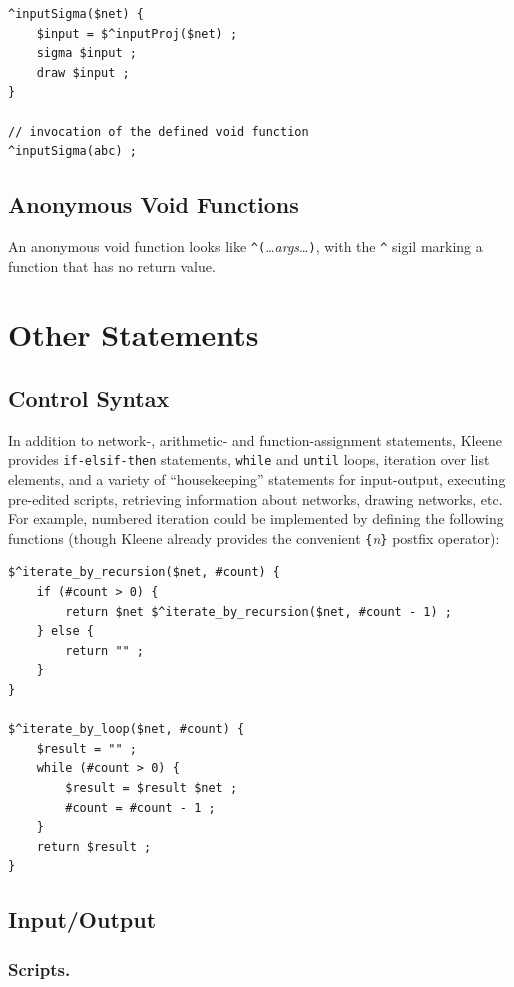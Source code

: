 \documentclass[letterpaper,12pt]{article}
\newcommand{\Kleene}{Kleene\xspace}
\begin{document}
\begin{Verbatim}[fontsize=\small]
^inputSigma($net) {
	$input = $^inputProj($net) ;
	sigma $input ;
	draw $input ;
}

// invocation of the defined void function
^inputSigma(abc) ;
\end{Verbatim}

\subsection{Anonymous Void Functions}

An anonymous void function looks like
\verb!^(!\ldots\emph{args}\ldots\verb!)!, with the \verb!^! sigil
marking a function that has no return value. 

\section{Other Statements}

\subsection{Control Syntax}

In addition to network-, arithmetic- and function-assignment statements,
\Kleene{} provides \verb!if-elsif-then! statements, \verb!while!  and
\verb!until!  loops, iteration over list elements, and a variety of
``housekeeping'' statements for input-output, executing pre-edited
scripts, retrieving information about networks, drawing networks, etc.
For example, numbered iteration could be implemented by defining the
following functions (though \Kleene{} already provides the convenient
\verb!{!\emph{n}\verb!}! postfix operator):

\begin{Verbatim}[fontsize=\small]
$^iterate_by_recursion($net, #count) {
    if (#count > 0) {
        return $net $^iterate_by_recursion($net, #count - 1) ;
    } else {
        return "" ;
    }
}

$^iterate_by_loop($net, #count) {
    $result = "" ;
    while (#count > 0) {
        $result = $result $net ;
        #count = #count - 1 ;
    }
    return $result ;
}
\end{Verbatim}

\subsection{Input/Output}

\subsubsection{Scripts.}
\end{document}

